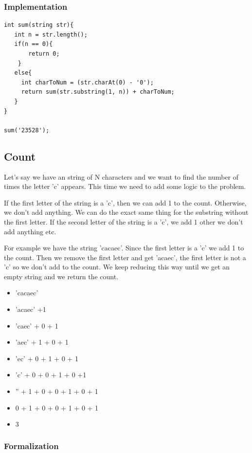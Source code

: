 \documentclass[11pt,oneside]{book}
\begin{document}
\subsubsection{Implementation}

\begin{lstlisting}
int sum(string str){
   int n = str.length();
   if(n == 0){
       return 0;
    }
   else{
     int charToNum = (str.charAt(0) - '0');
     return sum(str.substring(1, n)) + charToNum;
   }
}

sum('23528');
\end{lstlisting}

\subsection{Count}

Let's say we have an string of N characters and we want to find the number of times the letter 'c' appears. This time we need to add some logic to the problem.

If the first letter of the string is a 'c', then we can add 1 to the count. Otherwise, we don't add anything. We can do the exact same thing for the substring without the first letter. If the second letter of the string is a 'c', we add 1 other we don't add anything etc.

For example we have the string 'cacaec'. Since the first letter is a 'c' we add 1 to the count. Then we remove the first letter and get 'acaec', the first letter is not a 'c' so we don't add to the count. We keep reducing this way until we get an empty string and we return the count.

\begin{itemize}
\item 'cacaec'
\item 'acaec' +1
\item 'caec' + 0 + 1
\item 'aec' + 1 + 0 + 1
\item 'ec' + 0 + 1 + 0 + 1
\item 'c'  + 0 + 0 + 1 + 0 +1
\item '' + 1 + 0 + 0 + 1 + 0 + 1
\item 0 + 1 + 0 + 0 + 1 + 0 + 1
\item 3
\end{itemize}

\subsubsection{Formalization}
\end{document}
